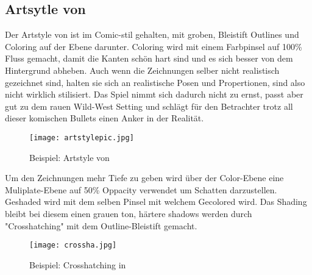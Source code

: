 \subsection{Artsytle von \FF}\label{subsec:artsytle}

Der Artstyle von \FF ist im Comic-stil gehalten, mit groben, Bleistift Outlines und Coloring auf der Ebene darunter.
Coloring wird mit einem Farbpinsel auf 100\% Fluss gemacht, damit die Kanten schön hart sind und es sich besser von dem Hintergrund abheben.
Auch wenn die Zeichnungen selber nicht realistisch gezeichnet sind, halten sie sich an realistische Posen und Propertionen, sind also nicht wirklich stilisiert.
Das Spiel nimmt sich dadurch nicht zu ernst, passt aber gut zu dem rauen Wild-West Setting und schlägt für den Betrachter trotz all dieser komischen Bullets
einen Anker in der Realität.

\begin{figure}[H]
    \texttt{[image: artstylepic.jpg]}
    \caption{Beispiel: Artstyle von \FF}
\end{figure}


Um den Zeichnungen mehr Tiefe zu geben wird über der Color-Ebene eine Muliplate-Ebene auf 50\% Oppacity verwendet um Schatten
darzustellen. Geshaded wird mit dem selben Pinsel mit welchem Gecolored wird. Das Shading bleibt bei diesem einen grauen ton,
härtere shadows werden durch "Crosshatching" mit dem Outline-Bleistift gemacht.

\begin{figure}[H]
    \texttt{[image: crossha.jpg]}
    \caption{Beispiel: Crosshatching in \FF}
\end{figure}

\renewcommand{\kapitelautor}{}
